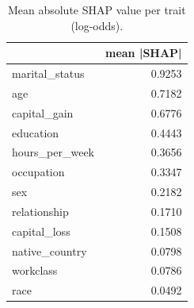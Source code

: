 \begin{table}
\caption{Mean absolute SHAP value per trait (log-odds).}
\label{tab:shap}
\begin{tabular}{lr}
\toprule
 & mean |SHAP| \\
\midrule
marital_status & 0.9253 \\
age & 0.7182 \\
capital_gain & 0.6776 \\
education & 0.4443 \\
hours_per_week & 0.3656 \\
occupation & 0.3347 \\
sex & 0.2182 \\
relationship & 0.1710 \\
capital_loss & 0.1508 \\
native_country & 0.0798 \\
workclass & 0.0786 \\
race & 0.0492 \\
\bottomrule
\end{tabular}
\end{table}
